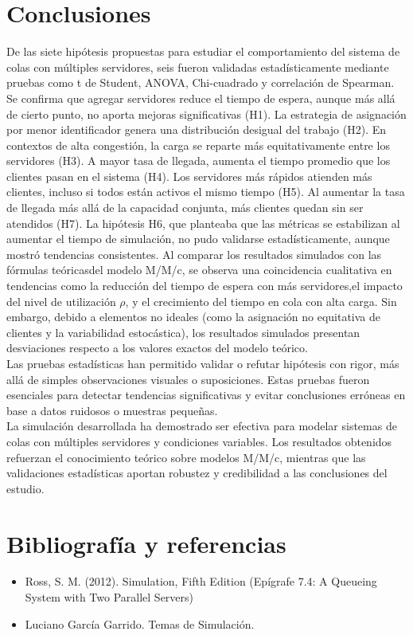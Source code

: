 \documentclass[12pt,a4paper]{article}
\begin{document}
\section{Conclusiones}
De las siete hipótesis propuestas para estudiar el comportamiento del sistema de colas con múltiples servidores, seis fueron
validadas estadísticamente mediante pruebas como t de Student, ANOVA, Chi-cuadrado y correlación de Spearman. Se confirma que agregar servidores reduce el tiempo de espera, aunque más allá de cierto punto, no aporta mejoras significativas (H1). La estrategia de asignación por menor identificador genera una distribución desigual del trabajo (H2). En contextos de alta congestión, la carga se reparte más equitativamente entre los servidores (H3). A mayor tasa de llegada, aumenta el tiempo promedio que los clientes pasan en el sistema (H4). Los servidores más rápidos atienden más clientes, incluso si todos están activos el mismo tiempo (H5). Al aumentar la tasa de llegada más allá de la capacidad conjunta, más clientes quedan sin ser atendidos (H7). La hipótesis H6, que planteaba que las métricas se estabilizan al aumentar el tiempo de simulación, no pudo validarse estadísticamente, aunque mostró tendencias consistentes. Al comparar los resultados simulados con las fórmulas teóricasdel modelo M/M/c, se observa una coincidencia cualitativa en tendencias como la reducción del tiempo de espera con más servidores,el impacto del nivel de utilización $\rho$, y el crecimiento del tiempo en cola con alta carga. Sin embargo, debido a elementos no ideales (como la asignación no equitativa de clientes y la variabilidad estocástica), los resultados simulados presentan desviaciones respecto a los valores exactos del modelo teórico.\\
Las pruebas estadísticas han permitido validar o refutar hipótesis con rigor, más allá de simples observaciones visuales o suposiciones. Estas pruebas fueron esenciales para detectar tendencias significativas y evitar conclusiones erróneas en base a datos ruidosos o muestras pequeñas.\\
La simulación desarrollada ha demostrado ser efectiva para modelar sistemas de colas con múltiples servidores y condiciones variables. Los resultados obtenidos refuerzan el conocimiento teórico sobre modelos M/M/c, mientras que las validaciones estadísticas aportan robustez y credibilidad a las conclusiones del estudio.

\section{Bibliografía y referencias}
\begin{itemize}
\item Ross, S. M. (2012). Simulation, Fifth Edition (Epígrafe 7.4: A Queueing System with Two Parallel Servers)
\item Luciano García Garrido. Temas de Simulación.
\end{itemize}
\end{document}
